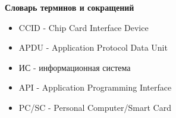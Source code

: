 \begin{titlepage}
  \begin{center}
    \textbf{Словарь терминов и сокращений}
    \vspace{1cm}
    \begin{itemize}
      \item[] CCID - Chip Card Interface Device
      \item[] APDU - Application Protocol Data Unit
      \item[] ИС - информационная система
      \item[] API - Application Programming Interface 
      \item[] PC/SC - Personal Computer/Smart Card 
    \end{itemize}
  \end{center}
\end{titlepage}

\clearpage